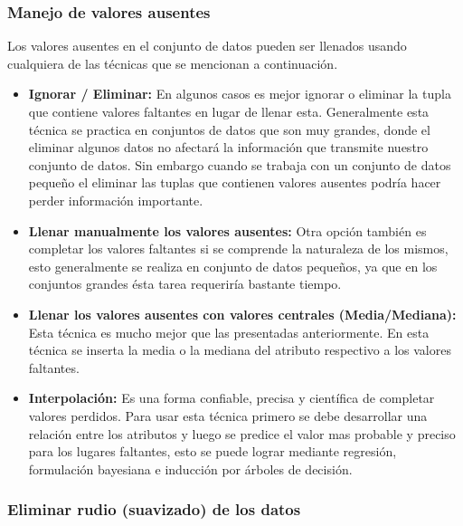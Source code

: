\subsubsection{Manejo de valores ausentes}

Los valores ausentes en el conjunto de datos pueden ser llenados usando cualquiera de las t\'{e}cnicas que se mencionan a continuaci\'{o}n.

\begin{itemize}
\item \textbf{Ignorar / Eliminar:} En algunos casos es mejor ignorar o eliminar la tupla que contiene valores faltantes en lugar de llenar esta. Generalmente esta t\'{e}cnica se practica en conjuntos de datos que son muy grandes, donde el eliminar algunos datos no afectar\'{a} la informaci\'{o}n que transmite nuestro conjunto de datos. Sin embargo cuando se trabaja con un conjunto de datos peque\~{n}o el eliminar las tuplas que contienen valores ausentes podr\'{i}a hacer perder informaci\'{o}n importante.

\item \textbf{Llenar manualmente los valores ausentes:} Otra opci\'{o}n tambi\'{e}n es completar los valores faltantes si se comprende la naturaleza de los mismos, esto generalmente se realiza en conjunto de datos peque\~{n}os, ya que en los conjuntos grandes \'{e}sta tarea requerir\'{i}a bastante tiempo.

\item \textbf{Llenar los valores ausentes con valores centrales (Media/Mediana):} Esta t\'{e}cnica es mucho mejor que las presentadas anteriormente. En esta t\'{e}cnica se inserta la media o la mediana del atributo respectivo a los valores faltantes. 

\item \textbf{Interpolaci\'{o}n:} Es una forma confiable, precisa y cient\'{i}fica de completar valores perdidos. Para usar esta t\'{e}cnica primero se debe desarrollar una relaci\'{o}n entre los atributos y luego se predice el valor mas probable y preciso para los lugares faltantes, esto se puede lograr mediante regresi\'{o}n, formulaci\'{o}n bayesiana e inducci\'{o}n por \'{a}rboles de decisi\'{o}n.

\end{itemize}

\subsubsection{Eliminar rudio (suavizado) de los datos}

